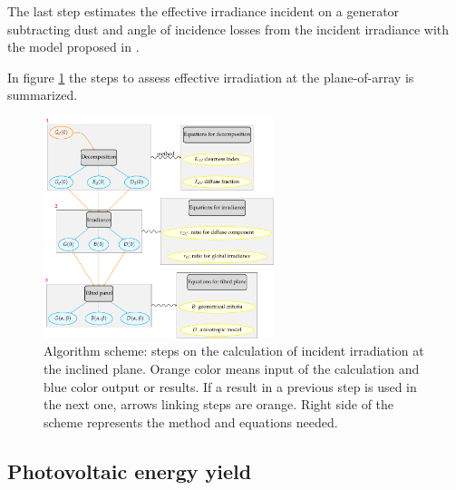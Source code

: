 The last step estimates the effective irradiance incident on a generator subtracting dust and angle of incidence losses from the incident irradiance with the model proposed in \cite{Martin2001}.

In figure \ref{fig:algorithm_outline} the steps to assess effective irradiation at the plane-of-array is summarized.

\begin{figure}
  \centering
  \includegraphics[width=0.6\textwidth]{DataMethodsFIGS/algorithm_outline}
  \caption{Algorithm scheme: steps on the calculation of incident irradiation at the inclined plane. Orange color means input of the calculation and blue color output or results. If a result in a previous step is used in the next one, arrows linking steps are orange. Right side of the scheme represents the method and equations needed.}
 \label{fig:algorithm_outline}
\end{figure}

\subsection{Photovoltaic energy yield}



